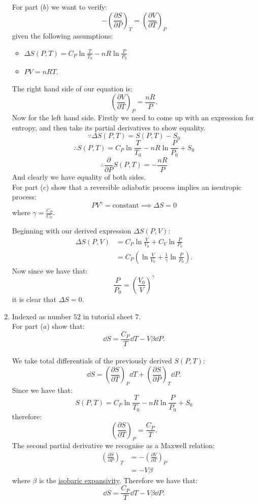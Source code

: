 \begin{enumerate}
    \newpage

    For part ($b$) we want to verify:
    $$-\left(\frac{\partial S}{\partial P}\right)_T
    =\left(\frac{\partial V}{\partial T}\right)_P$$
    given the following assumptions:
    \begin{itemize}
        \item $\Delta S(P,T)=C_P\ln\frac{T}{T_0}-nR\ln\frac{P}{P_0}$
        \item $PV=nRT$.
    \end{itemize}
    The right hand side of our equation is:
    $$\left(\frac{\partial V}{\partial T}\right)_P=\frac{nR}{P}.$$
    Now for the left hand side. Firstly we need to come up with
    an expression for entropy, and then take its partial derivatives to show equality.
    $$\because\Delta S(P,T)=S(P,T)-S_0$$
    $$\therefore S(P,T)
    =C_P\ln\frac{T}{T_0}-nR\ln\frac{P}{P_0}+S_0$$
    $$\therefore\frac{\partial}{\partial P}S(P,T)=-\frac{nR}{P}$$
    And clearly we have equality of both sides. \\

    For part ($c$) show that a reversible adiabatic process implies
    an isentropic process:
    $$PV^{\gamma}=\text{constant}\implies\Delta S=0$$
    where $\gamma=\displaystyle\frac{C_P}{C_V}$.

    Beginning with our derived expression $\Delta S(P,V)$:
    \begin{align*}
        \Delta S(P,V)
        &=C_P\ln\frac{V}{V_0}+C_V\ln\frac{P}{P_0} \\
        &=C_P\left(\ln\frac{V}{V_0}+\frac{1}{\gamma}\ln\frac{P}{P_0}\right).
    \end{align*}
    Now since we have that:
    $$\frac{P}{P_0}=\left(\frac{V_0}{V}\right)^{\gamma}$$
    it is clear that $\Delta S=0$.

    \newpage

    \item Indexed as number $52$ in tutorial sheet 7. \\
    
    For part ($a$) show that:
    $$\dd S=\frac{C_P}{T}\dd T -V\beta\dd P.$$ \\

    We take total differentials of the previously derived $S(P,T)$:
    $$\dd S=\left(\frac{\partial S}{\partial T}\right)_P\dd T
    +\left(\frac{\partial S}{\partial P}\right)_T\dd P.$$
    Since we have that:
    $$S(P,T)
    =C_P\ln\frac{T}{T_0}-nR\ln\frac{P}{P_0}+S_0$$
    therefore:
    $$\left(\frac{\partial S}{\partial T}\right)_P
    =\frac{C_P}{T}.$$
    The second partial derivative we recognise as a Maxwell relation:
    \begin{align*}
        \left(\frac{\partial S}{\partial P}\right)_T
        &=-\left(\frac{\partial V}{\partial T}\right)_P \\
        &=-V\beta
    \end{align*}
    where $\beta$ is the \underline{isobaric expansivity}.
    Therefore we have that:
    $$\dd S=\frac{C_P}{T}\dd T -V\beta\dd P.$$ \\


\end{enumerate}
